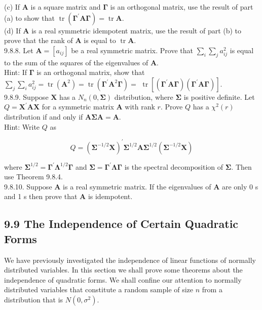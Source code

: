 (c) If $\mathbf{A}$ is a square matrix and $\boldsymbol{\Gamma}$ is an orthogonal matrix, use the result of part (a) to show that $\operatorname{tr}\left(\boldsymbol{\Gamma}^{\prime} \mathbf{A} \boldsymbol{\Gamma}\right)=\operatorname{tr} \mathbf{A}$.\\
(d) If $\mathbf{A}$ is a real symmetric idempotent matrix, use the result of part (b) to prove that the rank of $\mathbf{A}$ is equal to $\operatorname{tr} \mathbf{A}$.\\
9.8.8. Let $\mathbf{A}=\left[a_{i j}\right]$ be a real symmetric matrix. Prove that $\sum_{i} \sum_{j} a_{i j}^{2}$ is equal to the sum of the squares of the eigenvalues of $\mathbf{A}$.\\
Hint: If $\boldsymbol{\Gamma}$ is an orthogonal matrix, show that $\sum_{j} \sum_{i} a_{i j}^{2}=\operatorname{tr}\left(\mathbf{A}^{2}\right)=\operatorname{tr}\left(\boldsymbol{\Gamma}^{\prime} \mathbf{A}^{2} \boldsymbol{\Gamma}\right)=$ $\operatorname{tr}\left[\left(\boldsymbol{\Gamma}^{\prime} \mathbf{A} \boldsymbol{\Gamma}\right)\left(\boldsymbol{\Gamma}^{\prime} \mathbf{A} \boldsymbol{\Gamma}\right)\right]$.\\
9.8.9. Suppose $\mathbf{X}$ has a $N_{n}(0, \boldsymbol{\Sigma})$ distribution, where $\boldsymbol{\Sigma}$ is positive definite. Let $Q=\mathbf{X}^{\prime} \mathbf{A X}$ for a symmetric matrix $\mathbf{A}$ with rank $r$. Prove $Q$ has a $\chi^{2}(r)$ distribution if and only if $\mathbf{A} \boldsymbol{\Sigma} \mathbf{A}=\mathbf{A}$.\\
Hint: Write $Q$ as

$$
Q=\left(\boldsymbol{\Sigma}^{-1 / 2} \mathbf{X}\right)^{\prime} \boldsymbol{\Sigma}^{1 / 2} \mathbf{A} \boldsymbol{\Sigma}^{1 / 2}\left(\boldsymbol{\Sigma}^{-1 / 2} \mathbf{X}\right)
$$

where $\boldsymbol{\Sigma}^{1 / 2}=\boldsymbol{\Gamma}^{\prime} \boldsymbol{\Lambda}^{1 / 2} \boldsymbol{\Gamma}$ and $\boldsymbol{\Sigma}=\boldsymbol{\Gamma}^{\prime} \boldsymbol{\Lambda} \boldsymbol{\Gamma}$ is the spectral decomposition of $\boldsymbol{\Sigma}$. Then use Theorem 9.8.4.\\
9.8.10. Suppose $\mathbf{A}$ is a real symmetric matrix. If the eigenvalues of $\mathbf{A}$ are only 0 s and 1 s then prove that $\mathbf{A}$ is idempotent.

\subsection*{9.9 The Independence of Certain Quadratic Forms}
We have previously investigated the independence of linear functions of normally distributed variables. In this section we shall prove some theorems about the independence of quadratic forms. We shall confine our attention to normally distributed variables that constitute a random sample of size $n$ from a distribution that is $N\left(0, \sigma^{2}\right)$.

